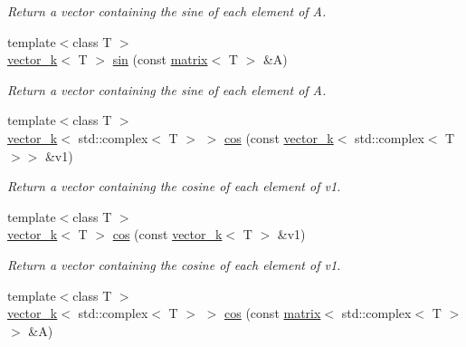 \begin{DoxyCompactItemize}
\begin{DoxyCompactList}\small\item\em Return a vector containing the sine of each element of A. \end{DoxyCompactList}\item 
\hypertarget{namespacekeycpp_ab89a85c0315b92a6844a77e352b5d50b}{{\footnotesize template$<$class T $>$ }\\\hyperlink{classkeycpp_1_1vector__k}{vector\-\_\-k}$<$ T $>$ \hyperlink{namespacekeycpp_ab89a85c0315b92a6844a77e352b5d50b}{sin} (const \hyperlink{classkeycpp_1_1matrix}{matrix}$<$ T $>$ \&A)}\label{namespacekeycpp_ab89a85c0315b92a6844a77e352b5d50b}

\begin{DoxyCompactList}\small\item\em Return a vector containing the sine of each element of A. \end{DoxyCompactList}\item 
\hypertarget{namespacekeycpp_a917607e20e487553be913b7ccaa4736d}{{\footnotesize template$<$class T $>$ }\\\hyperlink{classkeycpp_1_1vector__k}{vector\-\_\-k}$<$ std\-::complex$<$ T $>$ $>$ \hyperlink{namespacekeycpp_a917607e20e487553be913b7ccaa4736d}{cos} (const \hyperlink{classkeycpp_1_1vector__k}{vector\-\_\-k}$<$ std\-::complex$<$ T $>$$>$ \&v1)}\label{namespacekeycpp_a917607e20e487553be913b7ccaa4736d}

\begin{DoxyCompactList}\small\item\em Return a vector containing the cosine of each element of v1. \end{DoxyCompactList}\item 
\hypertarget{namespacekeycpp_a1d9cd34e13780fffeb1de19287f5636d}{{\footnotesize template$<$class T $>$ }\\\hyperlink{classkeycpp_1_1vector__k}{vector\-\_\-k}$<$ T $>$ \hyperlink{namespacekeycpp_a1d9cd34e13780fffeb1de19287f5636d}{cos} (const \hyperlink{classkeycpp_1_1vector__k}{vector\-\_\-k}$<$ T $>$ \&v1)}\label{namespacekeycpp_a1d9cd34e13780fffeb1de19287f5636d}

\begin{DoxyCompactList}\small\item\em Return a vector containing the cosine of each element of v1. \end{DoxyCompactList}\item 
\hypertarget{namespacekeycpp_acd9678129c9effcca74b8fff47876b1d}{{\footnotesize template$<$class T $>$ }\\\hyperlink{classkeycpp_1_1vector__k}{vector\-\_\-k}$<$ std\-::complex$<$ T $>$ $>$ \hyperlink{namespacekeycpp_acd9678129c9effcca74b8fff47876b1d}{cos} (const \hyperlink{classkeycpp_1_1matrix}{matrix}$<$ std\-::complex$<$ T $>$$>$ \&A)}\label{namespacekeycpp_acd9678129c9effcca74b8fff47876b1d}


\end{DoxyCompactItemize}
